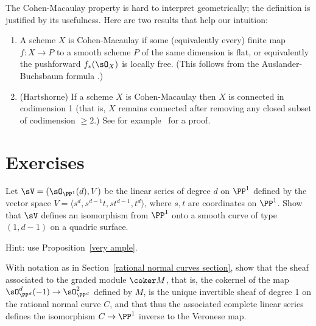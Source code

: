 \begin{fact}\label{meaning of ACM}
The Cohen-Macaulay property is hard to interpret geometrically; the definition is justified by its usefulness. Here are two results that help our intuition:
\begin{enumerate}
\item A scheme $X$ is Cohen-Macaulay if some (equivalently every) finite map $f: X\to P$ to a smooth scheme $P$
of the same dimension is flat, or equivalently the pushforward $f_*(\sO_X)$ is locally free. (This follows
from the Auslander-Buchsbaum formula \cite[Section 19.3]{Eisenbud1995}.)
\item (Hartshorne) If a scheme $X$ is Cohen-Macaulay then $X$ is connected in codimension 1 (that is, $X$ remains connected after removing any closed subset of codimension $\geq 2$.)
See for example~\cite[Theorem 18.12]{Eisenbud1995} for a proof.
\end{enumerate}
 
\end{fact}



\section{Exercises}

\begin{exercise}\label{1,d-1 on quadric}
Let $\sV =(\sO_{\PP^1}(d), V)$ be the linear series of degree $d$ on $\PP^1$ defined by the vector space 
$V = \langle s^{d},s^{d-1}t, st^{d-1}, t^d\rangle$, where $s,t$ are coordinates on $\PP^1$. Show that $\sV$ defines
an isomorphism from $\PP^1$ onto a smooth curve of type $(1,d-1)$ on a quadric surface.

Hint: use Proposition~\ref{very ample}.
\end{exercise}

\begin{exercise}\label{veronese inverse}
With notation as in Section~\ref{rational normal curves section}, show that the sheaf associated to the graded module $\coker M$,
that is, the cokernel of the map $\sO_{\PP^d}^d(-1) \to \sO_{\PP^d}^2$ defined by $M$, is the unique invertible sheaf of degree 1
on the rational normal curve $C$, and that thus the associated complete linear series defines the isomorphism $C\to \PP^1$ inverse
to the Veronese map.
\end{exercise}

